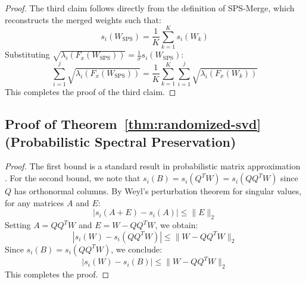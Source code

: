 \documentclass{article}
\theoremstyle{plain}
\theoremstyle{definition}
\theoremstyle{remark}
\begin{document}
\begin{proof}
The third claim follows directly from the definition of SPS-Merge, which reconstructs the merged weights such that:
\begin{equation}
    s_i(W_{\text{SPS}}) = \frac{1}{K}\sum_{k=1}^K s_i(W_k)
\end{equation}
Substituting $\sqrt{\lambda_i(F_x(W_{\text{SPS}}))} = \frac{1}{\sigma} s_i(W_{\text{SPS}})$:
\begin{equation}
    \sum_{i=1}^j \sqrt{\lambda_i(F_x(W_{\text{SPS}}))} = \frac{1}{K}\sum_{k=1}^K \sum_{i=1}^j \sqrt{\lambda_i(F_x(W_k))}
\end{equation}
This completes the proof of the third claim.
\end{proof}

\subsection{Proof of Theorem~\ref{thm:randomized-svd} (Probabilistic Spectral Preservation)}
\label{appendix:randomized-proof}
\begin{proof}
The first bound is a standard result in probabilistic matrix approximation \cite{halko2011finding}. For the second bound, we note that $s_i(B) = s_i(Q^T W) = s_i(Q Q^T W)$ since $Q$ has orthonormal columns. By Weyl's perturbation theorem for singular values, for any matrices $A$ and $E$:
\begin{equation}
    |s_i(A + E) - s_i(A)| \le \|E\|_2
\end{equation}
Setting $A = Q Q^T W$ and $E = W - Q Q^T W$, we obtain:
\begin{equation}
    |s_i(W) - s_i(Q Q^T W)| \le \|W - Q Q^T W\|_2
\end{equation}
Since $s_i(B) = s_i(Q Q^T W)$, we conclude:
\begin{equation}
    |s_i(W) - s_i(B)| \le \|W - Q Q^T W\|_2
\end{equation}
This completes the proof.
\end{proof}
\end{document}
